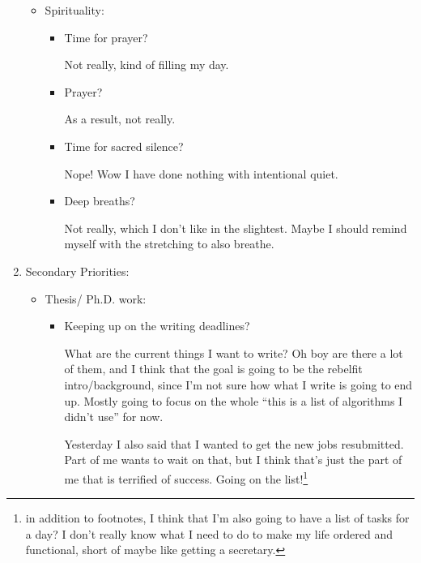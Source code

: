\documentclass[12pt]{article}
\newcommand{\say}[1]{``#1''}
\renewcommand{\,}{\textsuperscript{,}}
\begin{document}
\begin{enumerate}
\begin{itemize}
\item Spirituality:

\begin{itemize}

\item Time for prayer?

Not really, kind of filling my day.

\item Prayer?

As a result, not really.

\item Time for sacred silence?

Nope! Wow I have done nothing with intentional quiet.

\item Deep breaths?

Not really, which I don't like in the slightest.  
Maybe I should remind myself with the stretching to also breathe.

\end{itemize}

\end{itemize}

\item Secondary Priorities:

\begin{itemize}

\item Thesis/ Ph.D. work:

\begin{itemize}

\item Keeping up on the writing deadlines?

What are the current things I want to write?  
Oh boy are there a lot of them, and I think that the goal is going to be the rebelfit intro/background, since I'm not sure how what I write is going to end up.  
Mostly going to focus on the whole \say{this is a list of algorithms I didn't use} for now.

Yesterday I also said that I wanted to get the new jobs resubmitted.  
Part of me wants to wait on that, but I think that's just the part of me that is terrified of success.  
Going on the list!\footnote{in addition to footnotes, I think that I'm also going to have a list of tasks for a day? I don't really know what I need to do to make my life ordered and functional, short of maybe like getting a secretary.}

\begin{itemize}


\end{itemize}
\end{itemize}
\end{itemize}
\end{enumerate}
\end{document}
